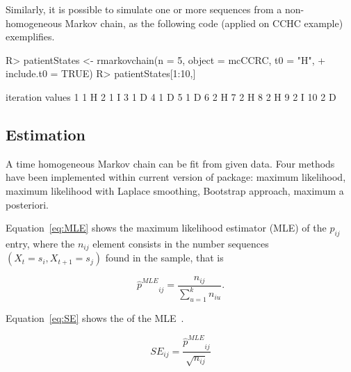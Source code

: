 \documentclass[nojss]{jss}
\begin{document}
Similarly, it is possible to simulate one or more sequences from a non-homogeneous Markov chain, 
as the following code (applied on CCHC example) exemplifies.

\begin{Schunk}
\begin{Sinput}
R> patientStates <- rmarkovchain(n = 5, object = mcCCRC, t0 = "H", 
+                                include.t0 = TRUE)
R> patientStates[1:10,]
\end{Sinput}
\begin{Soutput}
   iteration values
1          1      H
2          1      I
3          1      D
4          1      D
5          1      D
6          2      H
7          2      H
8          2      H
9          2      I
10         2      D
\end{Soutput}
\end{Schunk}

\subsection{Estimation}

A time homogeneous Markov chain can be fit from given data. Four methods have been implemented within current version of
 package: maximum likelihood, maximum likelihood with Laplace
smoothing, Bootstrap approach, maximum a posteriori. 

Equation~\ref{eq:MLE} shows the maximum likelihood estimator (MLE) of the
$p_{ij}$ entry, where the $n_{ij}$ element consists in the number sequences $\left( X_{t}=s_{i}, X_{t+1}=s_{j}\right)$
found in the sample, that is

\begin{equation}
{\hat p^{MLE}}_{ij} = \frac{{{n_{ij}}}}{{\sum\limits_{u = 1}^k {{n_{iu}}} }}.
\label{eq:MLE}
\end{equation}

Equation~\ref{eq:SE} shows the  of the MLE~\citep{MSkuriat}.

\begin{equation}
SE_{ij} = \frac{ {\hat p^{MLE}}_{ij} }{\sqrt{n_{ij}}}
\label{eq:SE}
\end{equation}
\end{document}
